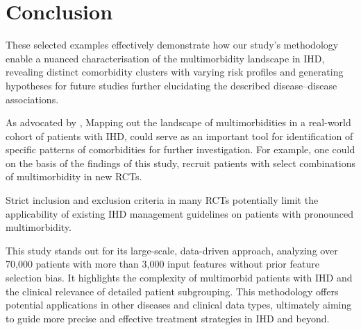 \section{Conclusion}

These selected examples effectively demonstrate how our study's methodology 
enable a nuanced characterisation of the multimorbidity landscape in \ac{IHD},
revealing distinct comorbidity clusters with varying risk profiles
and generating hypotheses for future studies further elucidating 
the described disease--disease associations.

As advocated by \textcite{whittyMap2020}, Mapping out the landscape of multimorbidities in a real-world cohort of 
patients with \ac{IHD}, could serve as an important tool for identification
of specific patterns of comorbidities for further investigation.
For example, one could on the basis of the findings of this study,
recruit patients with select combinations of multimorbidity in
new \acp{RCT}.

Strict inclusion and exclusion criteria in many \acp{RCT} 
potentially limit the applicability of existing \ac{IHD} 
management guidelines on patients with pronounced multimorbidity.
~\autocite{richKnowledge2016}

This study stands out for its large-scale, data-driven approach, analyzing over
70,000 patients with more than 3,000 input features without prior feature
selection bias.
It highlights the complexity of multimorbid patients with IHD
and the clinical relevance of detailed patient subgrouping. 
This methodology
offers potential applications in other diseases and clinical data types,
ultimately aiming to guide more precise and effective treatment strategies in
IHD and beyond.
